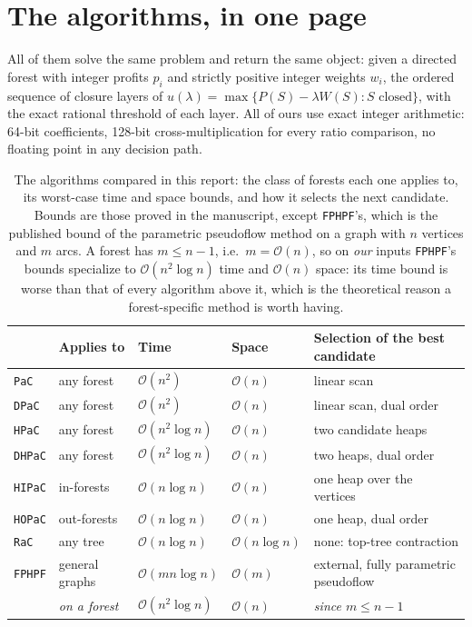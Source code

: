 \documentclass[11pt]{article}
\begin{document}
\section{The algorithms, in one page}\label{sec:algos}

All of them solve the same problem and return the same object: given a
directed forest with integer profits $p_i$ and strictly positive integer
weights $w_i$, the ordered sequence of closure layers of
$u(\lambda)=\max\{P(S)-\lambda W(S): S \text{ closed}\}$, with the exact
rational threshold of each layer. All of ours use exact integer arithmetic:
64-bit coefficients, 128-bit cross-multiplication for every ratio comparison,
no floating point in any decision path.

\begin{table}[htbp]
\centering
\caption{The algorithms compared in this report: the class of forests each one
applies to, its worst-case time and space bounds, and how it selects the next
candidate. Bounds are those proved in the manuscript, except \texttt{FPHPF}'s,
which is the published bound of the parametric pseudoflow method on a graph
with $n$ vertices and $m$ arcs. A forest has $m\le n-1$, i.e.\
$m=\mathcal O(n)$, so on \emph{our} inputs \texttt{FPHPF}'s bounds specialize to
$\mathcal O(n^2\log n)$ time and $\mathcal O(n)$ space: its time bound is worse
than that of every algorithm above it, which is the theoretical reason a
forest-specific method is worth having.}
\label{tab:algos}
\small
\begin{tabular}{@{}lllll@{}}
\toprule
& Applies to & Time & Space & Selection of the best candidate \\
\midrule
\texttt{PaC}   & any forest    & $\mathcal O(n^2)$      & $\mathcal O(n)$      & linear scan \\
\texttt{DPaC}  & any forest    & $\mathcal O(n^2)$      & $\mathcal O(n)$      & linear scan, dual order \\
\texttt{HPaC}  & any forest    & $\mathcal O(n^2\log n)$& $\mathcal O(n)$      & two candidate heaps \\
\texttt{DHPaC} & any forest    & $\mathcal O(n^2\log n)$& $\mathcal O(n)$      & two heaps, dual order \\
\texttt{HIPaC} & in-forests    & $\mathcal O(n\log n)$  & $\mathcal O(n)$      & one heap over the vertices \\
\texttt{HOPaC} & out-forests   & $\mathcal O(n\log n)$  & $\mathcal O(n)$      & one heap, dual order \\
\texttt{RaC}   & any tree      & $\mathcal O(n\log n)$  & $\mathcal O(n\log n)$& none: top-tree contraction \\
\midrule
\texttt{FPHPF} & general graphs& $\mathcal O(mn\log n)$ & $\mathcal O(m)$      & external, fully parametric pseudoflow \\
               & \emph{on a forest} & $\mathcal O(n^2\log n)$ & $\mathcal O(n)$ & \emph{since $m\le n-1$} \\
\bottomrule
\end{tabular}
\end{table}
\end{document}
